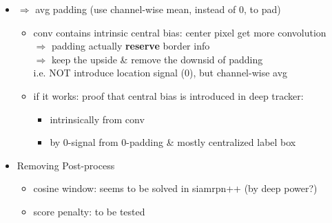 \begin{itemize}
\begin{itemize}
\begin{itemize}
		\end{itemize}
	\item $\Rightarrow$ avg padding (use channel-wise mean, instead of 0, to pad)
		\begin{itemize}
		\item conv contains intrinsic central bias: center pixel get more convolution \\
		$\Rightarrow$ padding actually \textbf{reserve} border info \\
		$\Rightarrow$ keep the upside \& remove the downsid of padding \\
		i.e. NOT introduce location signal (0), but channel-wise avg
		\item if it works: proof that central bias is introduced in deep tracker:
			\begin{itemize}
			\item intrinsically from conv
			\item by 0-signal from 0-padding \& mostly centralized label box
			\end{itemize}
		\end{itemize}
	\item Removing Post-process
		\begin{itemize}
		\item cosine window: seems to be solved in siamrpn++ (by deep power?)
		\item score penalty: to be tested
		\end{itemize}
	\end{itemize}
\end{itemize}

